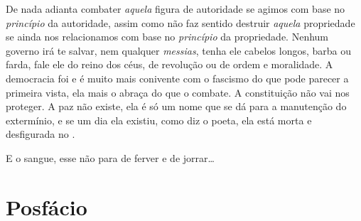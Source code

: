 De nada adianta combater \emph{aquela} figura de autoridade se agimos
com base no \emph{princípio} da autoridade, assim como não faz sentido
destruir \emph{aquela} propriedade se ainda nos relacionamos com base no
\emph{princípio} da propriedade. Nenhum governo irá te salvar, nem
qualquer \emph{messias}, tenha ele cabelos longos, barba ou farda, fale
ele do reino dos céus, de revolução ou de ordem e moralidade. A
democracia foi e é muito mais conivente com o fascismo do que pode
parecer a primeira vista, ela mais o abraça do que o combate. A
constituição não vai nos proteger. A paz não existe, ela é só um nome
que se dá para a manutenção do extermínio, e se um dia ela existiu, como
diz o poeta, ela está morta e desfigurada no .

E o sangue, esse não para de ferver e de jorrar\ldots{}


\chapter[Posfácio]{Posfácio }

\lipsum[5]
\lipsum[5]
\lipsum[5]
\lipsum[5]
\lipsum[5]